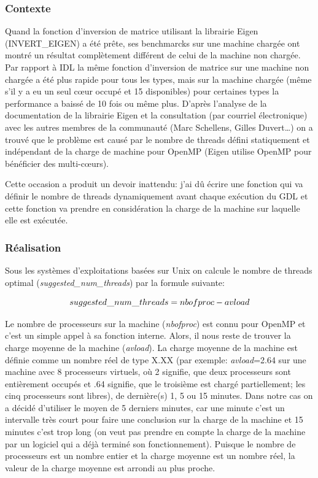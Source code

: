 \subsubsection{Contexte}
Quand la fonction d'inversion de matrice utilisant la librairie Eigen (INVERT\_EIGEN) a été prête, ses benchmarcks sur une machine chargée ont montré un résultat complètement différent de celui de la machine non chargée. Par rapport à IDL la même fonction d'inversion de matrice sur une machine non chargée a été plus rapide pour tous les types, mais sur la machine chargée (même s'il y a eu un seul cœur occupé et 15 disponibles) pour certaines types la performance a baissé de 10 fois ou même plus. D’après l'analyse de la documentation de la librairie Eigen et la consultation (par courriel électronique) avec les autres membres de la communauté (Marc Schellens, Gilles Duvert\ldots) on a trouvé que le problème est causé par le nombre de threads défini statiquement et indépendant de la charge de machine pour OpenMP (Eigen utilise OpenMP pour bénéficier des multi-cœurs).

Cette occasion a produit un devoir inattendu: j'ai dû écrire une fonction qui va définir le nombre de threads dynamiquement avant chaque exécution du GDL et cette fonction va prendre en considération la charge de la machine sur laquelle elle est exécutée.

\subsubsection{Réalisation}
Sous les systèmes d'exploitations basées sur Unix on calcule le nombre de threads optimal (\textit{suggested\_num\_threads}) par la formule suivante:

\begin{equation}
	\large
	suggested\_num\_threads=nbofproc-avload
   	\label{form:num_threads_u}
\end{equation}

Le nombre de processeurs sur la machine (\textit{nbofproc}) est connu pour OpenMP et c'est un simple appel à sa fonction interne. Alors, il nous reste de trouver la charge moyenne de la machine (\textit{avload}). La charge moyenne de la machine est définie comme un nombre réel de type X.XX (par exemple: \textit{avload}=2.64 sur une machine avec 8 processeurs virtuels, où 2 signifie, que deux processeurs sont entièrement occupés et .64 signifie, que le troisième est chargé partiellement; les cinq processeurs sont libres), de dernière(s) 1, 5 ou 15 minutes. Dans notre cas on a décidé d'utiliser le moyen de 5 derniers minutes, car une minute c'est un intervalle très court pour faire une conclusion sur la charge de la machine et 15 minutes c'est trop long (on veut pas prendre en compte la charge de la machine par un logiciel qui a déjà terminé son fonctionnement). Puisque le nombre de processeurs est un nombre entier et la charge moyenne est un nombre réel, la valeur de la charge moyenne est arrondi au plus proche.

